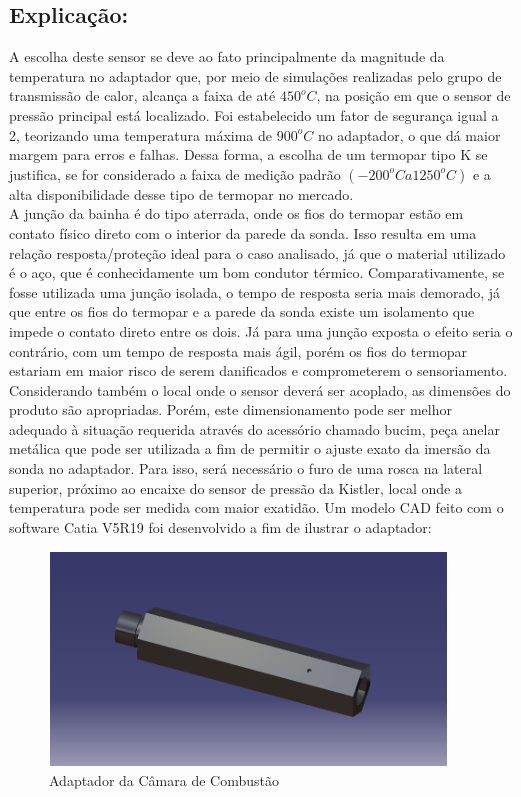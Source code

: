 \subsection{Explicação:}
	A escolha deste sensor se deve ao fato principalmente da magnitude da temperatura no adaptador que, por meio de simulações realizadas pelo grupo de transmissão de calor, alcança a faixa de até $450^o C$, na posição em que o sensor de pressão principal está localizado. Foi estabelecido um fator de segurança igual a 2, teorizando uma temperatura máxima de $900^{o}C$ no adaptador, o que dá maior margem para erros e falhas. Dessa forma, a escolha de um termopar tipo K se justifica, se for considerado a faixa de medição padrão $(-200^o C a 1250^o C)$ e a alta disponibilidade desse tipo de termopar no mercado.\\
	A junção da bainha é do tipo aterrada, onde os fios do termopar estão em contato físico direto com o interior da parede da sonda. Isso resulta em uma relação resposta/proteção ideal para o caso analisado, já que o material utilizado é o aço, que é conhecidamente um bom condutor térmico. Comparativamente, se fosse utilizada uma junção isolada, o tempo de resposta seria mais demorado, já que entre os fios do termopar e a parede da sonda existe um isolamento que impede o contato direto entre os dois. Já para uma junção exposta o efeito seria o contrário, com um tempo de resposta mais ágil, porém os fios do termopar estariam em maior risco de serem danificados e comprometerem o sensoriamento.\\
	Considerando também o local onde o sensor deverá ser acoplado, as dimensões do produto são apropriadas. Porém, este dimensionamento pode ser melhor adequado à situação requerida através do acessório chamado bucim, peça anelar metálica que pode ser utilizada a fim de permitir o ajuste exato da imersão da sonda no adaptador. Para isso, será necessário o furo de uma rosca na lateral superior, próximo ao encaixe do sensor de pressão da Kistler, local onde a temperatura pode ser medida com maior exatidão. Um modelo CAD feito com o software Catia V5R19 foi desenvolvido a fim de ilustrar o adaptador:
\begin{figure}[!htb]                   
		\centering                          
		\includegraphics[scale=1]{figuras/adaptador.png}
		\caption{Adaptador da Câmara de Combustão}               
\end{figure}
